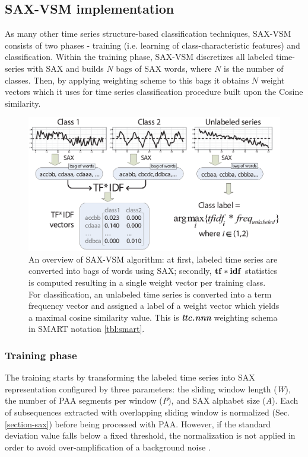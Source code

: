 \subsection{SAX-VSM implementation} \label{sax-vsm}
As many other time series structure-based classification techniques, SAX-VSM consists of two 
phases - training (i.e. learning of class-characteristic features) and classification. 
Within the training phase, SAX-VSM discretizes all labeled time-series with SAX and builds $N$ bags of SAX words, 
where $N$ is the number of classes. 
Then, by applying \tfidf weighting scheme to this bags it obtains $N$ weight vectors which it uses for 
time series classification procedure built upon the Cosine similarity.

\begin{figure}[t]
   \centering
   \includegraphics[width=148mm]{figures/SAX-VSM_overview.eps}
   \caption{
   An overview of SAX-VSM algorithm: 
   at first, labeled time series are converted into bags of words using SAX; 
   secondly, $\text{\textbf{tf}}\ast\text{\textbf{idf}}$ statistics is computed resulting in 
   a single weight vector per training class. For classification, an unlabeled 
   time series is converted into a term frequency vector and assigned a 
   label of a weight vector which yields a maximal cosine similarity value.
   This is \textit{\textbf{ltc.nnn}} weighting schema in SMART notation \ref{tbl:smart}.}
   \label{fig:sax-vsm_overview}
\end{figure}

\subsubsection{Training phase}
The training starts by transforming the labeled time series into SAX representation
configured by three parameters: the sliding window length (\textit{W}), 
the number of PAA segments per window (\textit{P}), 
and SAX alphabet size (\textit{A}).
Each of subsequences extracted with overlapping sliding window 
is normalized (Sec. \ref{section-sax}) before being processed with PAA. 
However, if the standard deviation value falls below a fixed threshold, the 
normalization is not applied in order to avoid over-amplification 
of a background noise \cite{sax}. 

